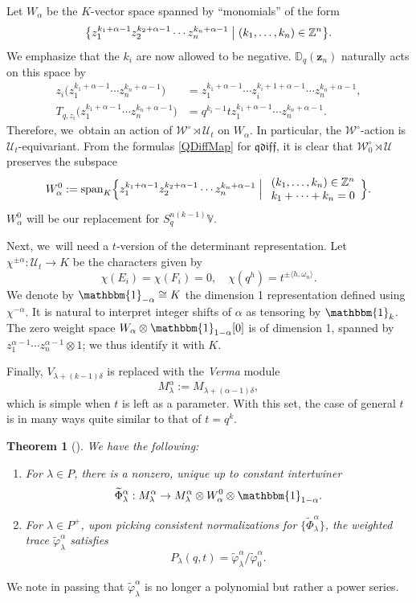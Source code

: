 \documentclass[JEP,XML,SOM,Unicode,published]{cedram}
\newtheorem{thm}{Theorem}[section]
\theoremstyle{definition}
\newcommand{\ZZ}{\mathbb{Z}}
\newcommand{\UU}{\mathcal{U}}
\newcommand{\WW}{\mathcal{W}}
\newcommand{\WWo}{\WW^\circ}
\begin{document}
Let $W_\alpha$ be the $K$-vector space spanned by ``monomials'' of the form
\[
\bigl\{z_1^{k_1+\alpha-1}z_2^{k_2+\alpha-1}\cdots z_n^{k_n+\alpha-1}\bigm| (k_1,\ldots, k_n)\in\ZZ^n \bigr\}.
\]
We emphasize that the $k_i$ are now allowed to be negative.
$\mathbb{D}_q(\boldsymbol{z}_n)$ naturally acts on this space by
\begin{align*}
z_i\bigl(z_1^{k_1+\alpha-1}\cdots z_n^{k_n+\alpha-1}\bigr)&= z_1^{k_1+\alpha-1}\cdots z_i^{k_i+1+\alpha-1}\cdots z_n^{k_n+\alpha-1},\\
T_{q,z_i} \bigl(z_1^{k_1+\alpha-1}\cdots z_n^{k_n+\alpha-1}\bigr)&= q^{k_i-1}tz_1^{k_1+\alpha-1}\cdots z_n^{k_n+\alpha-1}.
\end{align*}
Therefore, we~obtain an action of $\WWo\rtimes\UU_t$ on $W_\alpha$.
In particular, the $\WWo$-action is $\UU_t$-equivariant.
From the formulas \eqref{QDiffMap} for $\mathfrak{qdiff}$, it is clear that $\WWo_0\rtimes\UU$ preserves the subspace
\[
W^0_\alpha:=
\mathrm{span}_{K}\Bigl\{z_1^{k_1+\alpha-1}z_2^{k_2+\alpha-1}\cdots z_n^{k_n+\alpha-1}\Bigm|
\begin{array}{l}
(k_1,\ldots, k_n)\in\ZZ^n \\
k_1+\cdots +k_n=0
\end{array}
\Bigr\}.
\]
$W^0_\alpha$ will be our replacement for $S_q^{n(k-1)}\mathbb{V}$.

Next, we~will need a $t$-version of the determinant representation.
Let $\chi^{\pm\alpha}:\UU_t\to K$ be the characters given by
\begin{equation*}
\chi(E_i)=\chi(F_i)=0,\quad
\chi(q^{h})=t^{\pm\langle h,\omega_n\rangle}.
\end{equation*}
We denote by $\mathbbm{1}_{-\alpha}\cong K$ the dimension 1 representation defined using $\chi^{-\alpha}$.
It is natural to interpret integer shifts of $\alpha$ as tensoring by $\mathbbm{1}_k$.
The zero weight space $W_\alpha\otimes\mathbbm{1}_{1-\alpha}[0]$ is of dimension 1, spanned by $z_1^{\alpha-1}\cdots z_n^{\alpha-1}\otimes 1$; we thus identify it with $K$.

Finally, $V_{\lambda+(k-1)\delta}$ is replaced with the \textit{Verma} module
\[
M_\lambda^\alpha:=M_{\lambda+(\alpha-1)\delta},
\]
which is simple when $t$ is left as a parameter.
With this set, the case of general $t$ is in many ways quite similar to that of $t=q^k$.
\begin{thm}[\cite{EtKirQuant}]
We have the following:
\begin{enumerate}
\item For $\lambda\in P$, there is a nonzero, unique up to constant intertwiner
\[
\widetilde{\Phi}_\lambda^\alpha: M_{\lambda}^{\alpha}\to M_{\lambda}^{\alpha}\otimes W^0_{\alpha}\otimes\mathbbm{1}_{1-\alpha}.
\]
\item For $\lambda\in P^+$, upon picking consistent normalizations for $\{ \widetilde{\Phi}_\lambda^\alpha \}$, the weighted trace $\widetilde{\varphi}^\alpha_{\lambda}$ satisfies
\[
P_\lambda(q,t)=\widetilde{\varphi}_{\lambda}^\alpha\big/\widetilde{\varphi}_{0}^\alpha.
\]
\end{enumerate}
\end{thm}
We note in passing that $\widetilde{\varphi}_{\lambda}^\alpha$ is no longer a polynomial but rather a power series.
\end{document}
